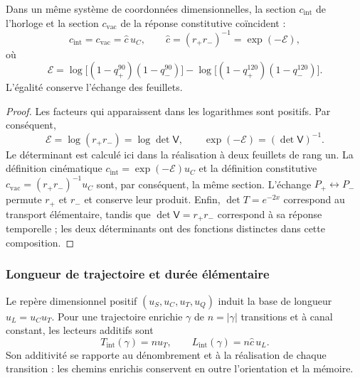 \begin{proposition}
\label{v:prop:identidad-velocidad}
Dans un même système de coordonnées dimensionnelles, la section $c_{\mathrm{int}}$ de l’horloge
et la section $c_{\mathrm{vac}}$ de la réponse constitutive coïncident :
\begin{equation}
 c_{\mathrm{int}}=c_{\mathrm{vac}}
   =\widehat c\,u_C,
 \qquad
 \widehat c=(r_+r_-)^{-1}
            =\exp(-\mathcal E),
 \label{v:eq:identidad-velocidad}
\end{equation}
où
\begin{equation}
 \mathcal E=
 \log\!\bigl[(1-q_+^{90})(1-q_-^{90})\bigr]
 -\log\!\bigl[(1-q_+^{120})(1-q_-^{120})\bigr].
 \label{v:eq:velocidad-lector-simetrico}
\end{equation}
L’égalité conserve l’échange des feuillets.
\end{proposition}
\begin{proof}
Les facteurs qui apparaissent dans les logarithmes sont positifs. Par conséquent,
\[
 \mathcal E=\log(r_+r_-)
            =\log\det\mathsf V,
 \qquad \exp(-\mathcal E)=(\det\mathsf V)^{-1}.
\]
Le déterminant est calculé ici dans la réalisation à deux feuillets de rang
un. La définition cinématique $c_{\mathrm{int}}=\exp(-\mathcal E)u_C$
et la définition constitutive $c_{\mathrm{vac}}=(r_+r_-)^{-1}u_C$
sont, par conséquent, la même section. L’échange $P_+\leftrightarrow
P_-$ permute $r_+$ et $r_-$ et conserve leur produit. Enfin,
$\det T=e^{-2x}$ correspond au transport élémentaire, tandis que
$\det\mathsf V=r_+r_-$ correspond à sa réponse temporelle ; les deux
déterminants ont des fonctions distinctes dans cette composition.
\end{proof}

\subsubsection{Longueur de trajectoire et durée élémentaire}

Le repère dimensionnel positif $(u_S,u_C,u_T,u_Q)$ induit la base de longueur $u_L=u_Cu_T$. Pour une trajectoire enrichie $\gamma$ de $n=|\gamma|$ transitions et à canal constant, les lecteurs additifs sont
\begin{equation}
 T_{\mathrm{int}}(\gamma)=n u_T,
 \qquad L_{\mathrm{int}}(\gamma)=n\widehat c\,u_L.
 \label{v:eq:velocidad-longitud-reloj}
\end{equation}
Son additivité se rapporte au dénombrement et à la réalisation de chaque transition :
les chemins enrichis conservent en outre l’orientation et la mémoire.

